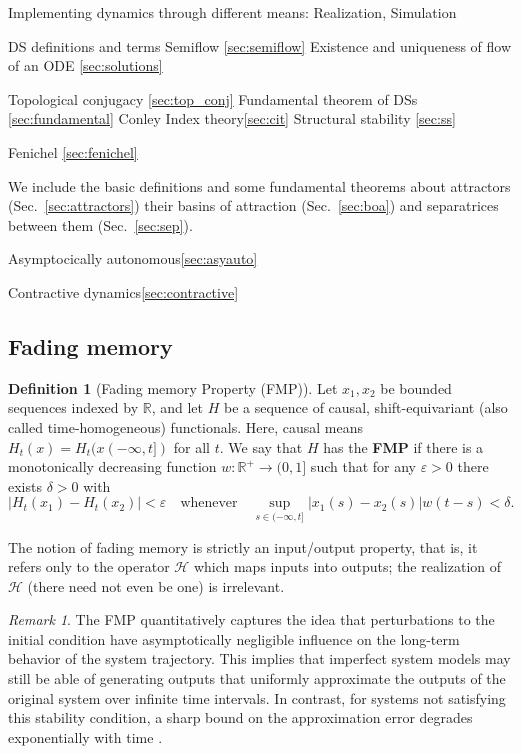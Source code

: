 \documentclass{article}
\theoremstyle{definition} \newtheorem{definition}{Definition}
\theoremstyle{remark} \newtheorem{remark}{Remark}
\newcounter{ct}
\begin{document}
Implementing dynamics through different means: Realization\label{sec:realization}, Simulation\label{sec:simulation}

DS definitions and terms 
Semiflow \ref{sec:semiflow}
Existence and uniqueness of flow of an ODE \ref{sec:solutions}

Topological conjugacy \ref{sec:top_conj}
Fundamental theorem of DSs \ref{sec:fundamental}
Conley Index theory\ref{sec:cit}
Structural stability \ref{sec:ss}

Fenichel \ref{sec:fenichel}

We include the basic definitions and some fundamental theorems about attractors (Sec.~\ref{sec:attractors})
their basins of attraction (Sec.~\ref{sec:boa}) and separatrices between them (Sec.~\ref{sec:sep}).

Asymptocically autonomous\ref{sec:asyauto}

Contractive dynamics\ref{sec:contractive}



\subsection{Fading memory}\label{sec:fading_memory}

\begin{definition}[Fading memory Property (FMP)]\label{def:fmp}
Let $x_1, x_2$ be bounded sequences indexed by $\mathbb{R}$, and let $H$ be a sequence of causal, shift-equivariant (also called time-homogeneous) functionals.
Here, causal means $H_t(x) = H_t(x(-\infty,t])$ for all $t$.
We say that $H$ has the \textbf{FMP} if there is a monotonically decreasing function $w : \mathbb{R}^+ \to (0, 1]$ such that for any $\varepsilon > 0$ there exists $\delta > 0$ with 
\[
|H_t(x_1) - H_t(x_2)| < \varepsilon \quad \text{whenever} \quad \sup_{s \in (-\infty, t]} |x_1(s) - x_2(s)| w(t - s) < \delta.
\]
\end{definition}
The notion of fading memory is strictly an input/output property, that is, it refers only to the operator $\mathcal{H}$ which maps inputs into outputs; the realization of $\mathcal{H}$ (there need not even be one) is irrelevant.

\begin{remark}\label{rem:fmp}%
The FMP quantitatively captures the idea that perturbations to the initial condition have asymptotically negligible influence on the long-term behavior of the system trajectory.
This implies that imperfect system models may still be able of generating outputs that uniformly approximate the outputs of the original system over infinite time intervals.
In contrast, for systems not satisfying this stability condition, a sharp bound on the approximation error degrades exponentially with time \citep{hirsch1974nonautonomous, sontag2013mathematical}.
\end{remark}
\end{document}
